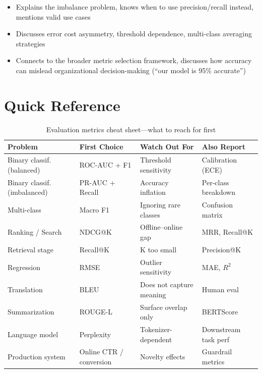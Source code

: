 \begin{interviewq}
\goodgreat
\begin{itemize}
    \item {} Explains the imbalance problem, knows when to use precision/recall instead, mentions valid use cases
    \item {} Discusses error cost asymmetry, threshold dependence, multi-class averaging strategies
    \item {} Connects to the broader metric selection framework, discusses how accuracy can mislead organizational decision-making (``our model is 95\% accurate'')
\end{itemize}

\end{interviewq}

\section{Quick Reference}
\label{sec:metrics_cheatsheet}

\begin{table}[H]
\centering
\caption{Evaluation metrics cheat sheet---what to reach for first}
\begin{tabularx}{\textwidth}{lXXl}
\toprule
\textbf{Problem} & \textbf{First Choice} & \textbf{Watch Out For} & \textbf{Also Report} \\
\midrule
Binary classif. (balanced) & ROC-AUC + F1 & Threshold sensitivity & Calibration (ECE) \\
Binary classif. (imbalanced) & PR-AUC + Recall & Accuracy inflation & Per-class breakdown \\
Multi-class & Macro F1 & Ignoring rare classes & Confusion matrix \\
Ranking / Search & NDCG@K & Offline--online gap & MRR, Recall@K \\
Retrieval stage & Recall@K & K too small & Precision@K \\
Regression & RMSE & Outlier sensitivity & MAE, $R^2$ \\
Translation & BLEU & Does not capture meaning & Human eval \\
Summarization & ROUGE-L & Surface overlap only & BERTScore \\
Language model & Perplexity & Tokenizer-dependent & Downstream task perf \\
Production system & Online CTR / conversion & Novelty effects & Guardrail metrics \\
\bottomrule
\end{tabularx}
\end{table}
